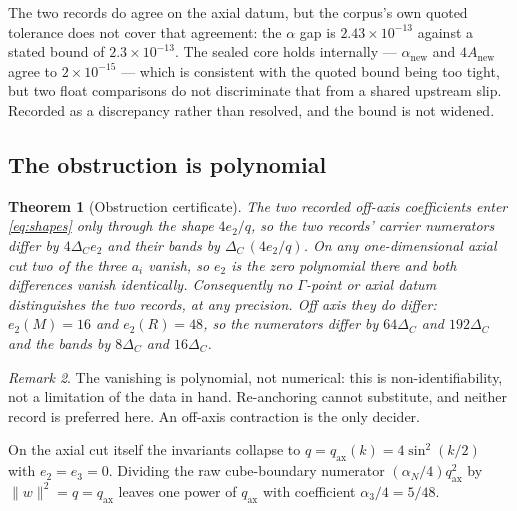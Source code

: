 \documentclass[11pt]{article}
\theoremstyle{plain}
\newtheorem{theorem}{Theorem}
\theoremstyle{definition}
\theoremstyle{remark}
\newtheorem{remark}[theorem]{Remark}
\newcommand{\chk}[1]{}
\begin{document}
The two records do agree on the axial datum, but the corpus's own quoted
tolerance does not cover that agreement: the $\alpha$ gap is
$2.43\times10^{-13}$ against a stated bound of $2.3\times10^{-13}$. The sealed core holds internally --- $\alpha_{\mathrm{new}}$ and
$4A_{\mathrm{new}}$ agree to $2\times10^{-15}$ --- which is consistent with the
quoted bound being too tight, but two float comparisons do not discriminate
that from a shared upstream slip. Recorded as a discrepancy rather than
resolved, and the bound is not widened.
\chk{v10a.26 A, B, D match the sealed rationals within 2.3e-13}
\chk{FINDING: alpha\_new falls outside the corpus's own 2.3e-13 bound}

\subsection{The obstruction is polynomial}

\begin{theorem}[Obstruction certificate]\label{thm:obstruction}
The two recorded off-axis coefficients enter \eqref{eq:shapes} only through
the shape $4e_2/q$, so the two records' carrier numerators differ by
$4\Delta_C e_2$ and their bands by $\Delta_C\,(4e_2/q)$. On any
one-dimensional axial cut two of the three $a_i$ vanish, so $e_2$ is the
\emph{zero polynomial} there and both differences vanish identically.
Consequently no $\Gamma$-point or axial datum distinguishes the two records,
at any precision. Off axis they do differ: $e_2(M)=16$ and $e_2(R)=48$, so the
numerators differ by $64\Delta_C$ and $192\Delta_C$ and the bands by
$8\Delta_C$ and $16\Delta_C$.
\end{theorem}
\chk{FINDING: the retained Gamma/axis data cannot identify C\_shp}
\chk{Phi\_C vanishes at Gamma along every direction}

\begin{remark}
The vanishing is polynomial, not numerical: this is non-identifiability, not a
limitation of the data in hand. Re-anchoring cannot substitute, and neither
record is preferred here. An off-axis contraction is the only decider.
\chk{the crosswalk is exactly scalar on the momentum axes}
\end{remark}

On the axial cut itself the invariants collapse to
$q=q_{\mathrm{ax}}(k)=4\sin^2(k/2)$ with $e_2=e_3=0$. Dividing the raw
cube-boundary numerator $(\alpha_N/4)q_{\mathrm{ax}}^2$ by
$\|w\|^2=q=q_{\mathrm{ax}}$ leaves one power of $q_{\mathrm{ax}}$ with
coefficient $\alpha_3/4=5/48$.
\chk{on an axial cut the mixed invariants vanish and the norm divides}
\end{document}
